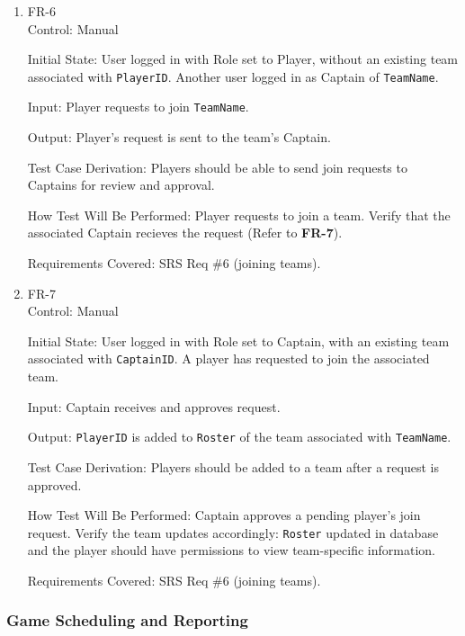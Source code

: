 \documentclass[12pt, titlepage]{article}
\begin{document}
\begin{enumerate}

  \item{FR-6\\}
        Control: Manual

        Initial State: User logged in with Role set to Player, without an existing team associated with \texttt{PlayerID}. Another user logged in as Captain of \texttt{TeamName}.

        Input: Player requests to join \texttt{TeamName}.

        Output: Player's request is sent to the team's Captain.

        Test Case Derivation: Players should be able to send join requests to Captains for review and approval.

        How Test Will Be Performed: Player requests to join a team. Verify that the associated Captain recieves the request (Refer to \textbf{FR-7}).

        Requirements Covered: SRS Req \#6 (joining teams).

  \item{FR-7\\}
        Control: Manual

        Initial State: User logged in with Role set to Captain, with an existing team associated with \texttt{CaptainID}. A player has requested to join the associated team.

        Input: Captain receives and approves request.

        Output: \texttt{PlayerID} is added to \texttt{Roster} of the team associated with \texttt{TeamName}.

        Test Case Derivation: Players should be added to a team after a request is approved.

        How Test Will Be Performed: Captain approves a pending player's join request. Verify the team updates accordingly: \texttt{Roster} updated in database and the player should have permissions to view team-specific information.

        Requirements Covered: SRS Req \#6 (joining teams).

\end{enumerate}

\subsubsection{Game Scheduling and Reporting}
\end{document}
